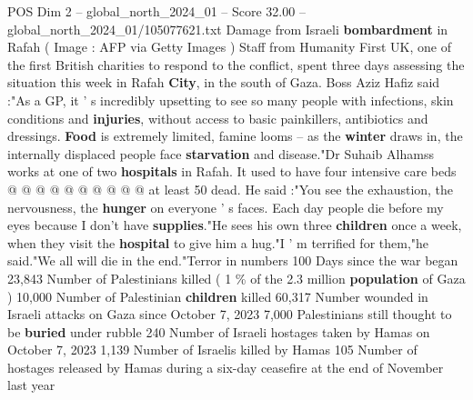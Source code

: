 \begin{textsample}{POS Dim 2 – global\_north\_2024\_01 – Score 32.00 – global\_north\_2024\_01/105077621.txt}
Damage from Israeli \textbf{bombardment} in Rafah ( Image : AFP via Getty Images ) Staff from Humanity First UK, one of the first British charities to respond to the conflict, spent three days assessing the situation this week in Rafah \textbf{City}, in the south of Gaza.
Boss Aziz Hafiz said :"As a GP, it ' s incredibly upsetting to see so many people with infections, skin conditions and \textbf{injuries}, without access to basic painkillers, antibiotics and dressings. \textbf{Food} is extremely limited, famine looms -- as the \textbf{winter} draws in, the internally displaced people face \textbf{starvation} and disease."Dr Suhaib Alhamss works at one of two \textbf{hospitals} in Rafah.
It used to have four intensive care beds @ @ @ @ @ @ @ @ @ @ at least 50 dead.
He said :"You see the exhaustion, the nervousness, the \textbf{hunger} on everyone ' s faces.
Each day people die before my eyes because I don't have \textbf{supplies}."He sees his own three \textbf{children} once a week, when they visit the \textbf{hospital} to give him a hug."I ' m terrified for them,"he said."We all will die in the end."Terror in numbers 100 Days since the war began 23,843 Number of Palestinians killed ( 1 \% of the 2.3 million \textbf{population} of Gaza ) 10,000 Number of Palestinian \textbf{children} killed 60,317 Number wounded in Israeli attacks on Gaza since October 7, 2023 7,000 Palestinians still thought to be \textbf{buried} under rubble 240 Number of Israeli hostages taken by Hamas on October 7, 2023 1,139 Number of Israelis killed by Hamas 105 Number of hostages released by Hamas during a six-day ceasefire at the end of November last year

\end{textsample}
